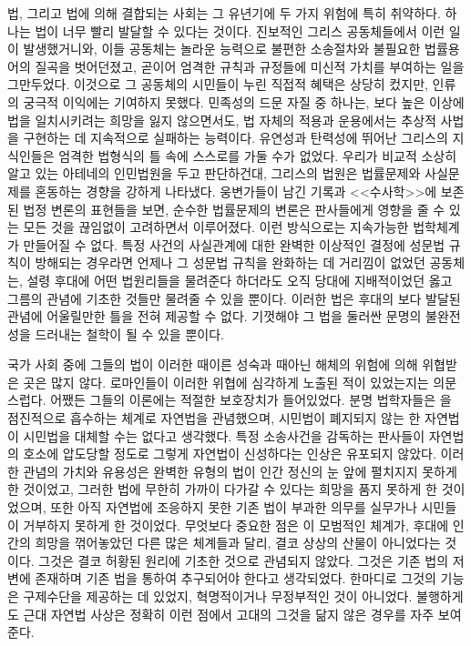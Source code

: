 법, 그리고 법에 의해 결합되는 사회는 그 유년기에
두 가지 위험에 특히 취약하다.
하나는 법이 너무 빨리 발달할 수 있다는 것이다.
진보적인 그리스 공동체들에서 이런 일이 발생했거니와,
이들 공동체는 놀라운 능력으로 불편한 소송절차와 불필요한 법률용어의
질곡을 벗어던졌고, 곧이어 엄격한 규칙과 규정들에 미신적 가치를 부여하는 일을
그만두었다.
이것으로 그 공동체의 시민들이 누린 직접적 혜택은 상당히 컸지만,
인류의 궁극적 이익에는 기여하지 못했다.
민족성의 드문 자질 중 하나는,
보다 높은 이상에 법을 일치시키려는 희망을 잃지 않으면서도,
법 자체의 적용과 운용에서는
추상적 사법을 구현하는 데 지속적으로 실패하는 능력이다.
유연성과 탄력성에 뛰어난
그리스의 지식인들은
엄격한 법형식의 틀 속에 스스로를 가둘 수가 없었다.
우리가 비교적 소상히 알고 있는 아테네의 인민법원을 두고 판단하건대,
그리스의 법원은 법률문제와 사실문제를 혼동하는 경향을 강하게 나타냈다.
웅변가들이 남긴 기록과
 <<수사학>>에 보존된
법정 변론의 표현들을 보면,
순수한 법률문제의 변론은
판사들에게 영향을 줄 수 있는 모든 것을 끊임없이 고려하면서 이루어졌다.
이런 방식으로는 지속가능한 법학체계가 만들어질 수 없다.
특정 사건의 사실관계에 대한 완벽한 이상적인 결정에 성문법 규칙이 방해되는
경우라면 언제나 그 성문법 규칙을 완화하는 데 거리낌이 없었던 공동체는,
설령 후대에 어떤 법원리들을 물려준다 하더라도
오직 당대에 지배적이었던 옳고 그름의 관념에 기초한 것들만 물려줄 수 있을 뿐이다.
이러한 법은 후대의 보다 발달된 관념에 어울릴만한 틀을 전혀 제공할 수 없다.
기껏해야 그 법을 둘러싼 문명의 불완전성을 드러내는 철학이 될 수 있을 뿐이다.

국가 사회 중에 그들의 법이
이러한 때이른 성숙과 때아닌 해체의 위험에 의해 위협받은 곳은 많지 않다.
로마인들이 이러한 위협에 심각하게 노출된 적이 있었는지는 의문스럽다.
어쨌든 그들의  이론에는 적절한 보호장치가 들어있었다.
분명 법학자들은 을 점진적으로 흡수하는 체계로 자연법을 관념했으며,
시민법이 폐지되지 않는 한 자연법이 시민법을 대체할 수는 없다고 생각했다.
특정 소송사건을 감독하는 판사들이 자연법의 호소에 압도당할 정도로
그렇게 자연법이 신성하다는 인상은 유포되지 않았다.
이러한 관념의 가치와 유용성은 완벽한 유형의 법이 인간 정신의 눈 앞에
펼치지지 못하게 한 것이었고, 그러한 법에 무한히 가까이 다가갈 수 있다는
희망을 품지 못하게 한 것이었으며, 또한 아직 자연법에 조응하지 못한
기존 법이 부과한 의무를 실무가나 시민들이 거부하지 못하게 한 것이었다.
무엇보다 중요한 점은 이 모범적인 체계가,
후대에 인간의 희망을 꺾어놓았던 다른 많은 체계들과 달리,
결코 상상의 산물이 아니었다는 것이다.
그것은 결코 허황된 원리에 기초한 것으로 관념되지 않았다.
그것은 기존 법의 저변에 존재하며 기존 법을 통하여 추구되어야 한다고 생각되었다.
한마디로 그것의 기능은 구제수단을 제공하는 데 있었지, 혁명적이거나
무정부적인 것이 아니었다.
불행하게도 근대 자연법 사상은
정확히 이런 점에서
고대의 그것을
닮지 않은 경우를 자주 보여준다.


